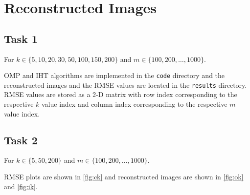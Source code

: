 \documentclass[a4paper, landscape]{article}
\begin{document}
\section{Reconstructed Images}
\subsection{Task 1}
For $k \in \{5,10,20,30,50,100,150,200\}$ and $m \in \{100,200,\ldots,1000\}$.

OMP and IHT algorithms are implemented in the \verb!code! directory and the reconstructed images and the RMSE values are located in the \verb!results! directory. RMSE values are stored as a 2-D matrix with row index corresponding to the respective $k$ value index and column index corresponding to the respective $m$ value index.
\subsection{Task 2}
For $k \in \{5,50,200\}$ and $m \in \{100,200,\ldots,1000\}$.

RMSE plots are shown in \ref{fig:ck} and reconstructed images are shown in \ref{fig:ok} and \ref{fig:ik}.
\end{document}

